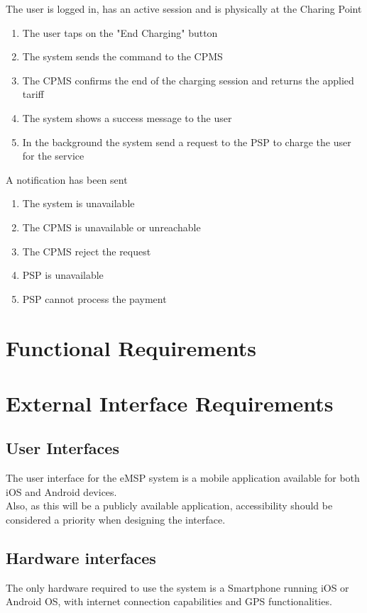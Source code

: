 \begin{enumerate}
	{The user is logged in, has an active session and is physically at the Charing Point}
	{
	\begin{enumerate}[1.]
	\item The user taps on the "End Charging" button
	\item The system sends the command to the CPMS
	\item The CPMS confirms the end of the charging session and returns the applied tariff
	\item The system shows a success message to the user
	\item In the background the system send a request to the PSP to charge the user for the service
	\end{enumerate}
	}
	{A notification has been sent}
	{
	\begin{enumerate}[1.]
	\item The system is unavailable
	\item The CPMS is unavailable or unreachable
	\item The CPMS reject the request
	\item PSP is unavailable
	\item PSP cannot process the payment
	\end{enumerate}
	}
	
	
\end{enumerate}
\clearpage
\newpage


\section{Functional Requirements}

\section{External Interface Requirements}
\subsection{User Interfaces}
The user interface for the eMSP system is a mobile application available for both iOS and Android devices.\\
Also, as this will be a publicly available application, accessibility should be considered a priority when designing the interface.

\subsection{Hardware interfaces}
The only hardware required to use the system is a Smartphone running iOS or Android OS, with internet connection capabilities and GPS functionalities.


